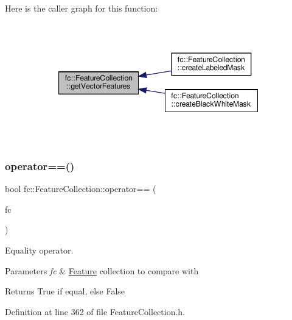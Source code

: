 Here is the caller graph for this function\+:
\nopagebreak
\begin{figure}[H]
\begin{center}
\leavevmode
\includegraphics[width=347pt]{d9/d78/classfc_1_1FeatureCollection_aafe9d7aca03c11d4d26a28f7e9360612_icgraph}
\end{center}
\end{figure}
\mbox{\label{classfc_1_1FeatureCollection_a6286aca807e61dc6931beca4e4d1d145}} 
\subsubsection{\texorpdfstring{operator==()}{operator==()}}
{\footnotesize\ttfamily bool fc\+::\+Feature\+Collection\+::operator== (\begin{DoxyParamCaption}\item[{\hyperlink{classfc_1_1FeatureCollection}{Feature\+Collection} \&}]{fc }\end{DoxyParamCaption})\hspace{0.3cm}{\ttfamily [inline]}}



Equality operator. 


\begin{DoxyParams}{Parameters}
{\em fc} & \hyperlink{classfc_1_1Feature}{Feature} collection to compare with \\
\hline
\end{DoxyParams}
\begin{DoxyReturn}{Returns}
True if equal, else False 
\end{DoxyReturn}


Definition at line 362 of file Feature\+Collection.\+h.

